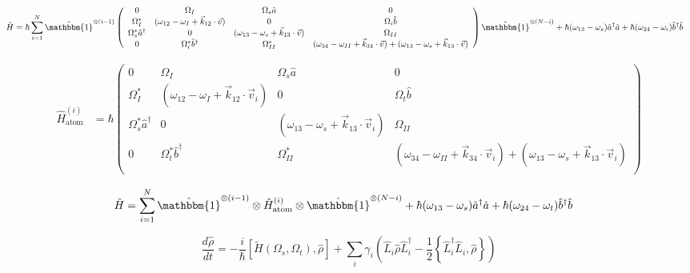 \documentclass[aps,pra,showpacs,amsmath,amssymb,nofootinbib,longbibliography,superscriptaddress
]{revtex4-1}
\theoremstyle{definition}
\theoremstyle{remark}
\newcommand{\0}{\hat{0}}
\begin{document}
\scriptsize{
\begin{align*}
    \tilde{H} &= \hbar \sum_{i=1}^{N} \hat{\mathbbm{1}}^{\otimes(i-1)} \left(\begin{array}{cccc}
        0 & \Omega_{I} & \Omega_{s} \hat{a} & 0\\
        \Omega_{I}^* & (\omega_{12} - \omega_I + \vec{k}_{12} \cdot \vec{v}) & 0 & \Omega_{i} \hat{b}\\
        \Omega_{s}^* \hat{a}^{\dagger} & 0 & (\omega_{13} - \omega_s + \vec{k}_{13} \cdot \vec{v}) & \Omega_{II}\\
        0 & \Omega_{i}^* \hat{b}^{\dagger} & \Omega_{II}^* & (\omega_{34} - \omega_{II} + \vec{k}_{34} \cdot \vec{v}) + (\omega_{13} - \omega_s + \vec{k}_{13} \cdot \vec{v})\\
    \end{array}\right) \hat{\mathbbm{1}}^{\otimes(N-i)}
     + \hbar (\omega_{13} - \omega_s) \hat{a}^{\dagger}\hat{a} + \hbar (\omega_{24} - \omega_i)  \hat{b}^{\dagger}\hat{b}
\end{align*}
}

\normalsize

\begin{align*}
    \hat{H}_{\text{atom}}^{(i)} &= \hbar \left(\begin{array}{cccc}
        0 & \Omega_{I} & \Omega_{s} \hat{a} & 0\\
        \Omega_{I}^* & (\omega_{12} - \omega_I + \vec{k}_{12} \cdot \vec{v}_i) & 0 & \Omega_{t} \hat{b}\\
        \Omega_{s}^* \hat{a}^{\dagger} & 0 & (\omega_{13} - \omega_s + \vec{k}_{13} \cdot \vec{v}_i) & \Omega_{II}\\
        0 & \Omega_{t}^* \hat{b}^{\dagger} & \Omega_{II}^* & (\omega_{34} - \omega_{II} + \vec{k}_{34} \cdot \vec{v}_i) + (\omega_{13} - \omega_s + \vec{k}_{13} \cdot \vec{v}_i)\\
    \end{array}\right)
\end{align*}

\begin{align*}
    \tilde{H} &= \sum_{i=1}^{N} \hat{\mathbbm{1}}^{\otimes(i-1)} \otimes \hat{H}_{\text{atom}}^{(i)} \otimes \hat{\mathbbm{1}}^{\otimes(N-i)} + \hbar (\omega_{13} - \omega_s) \hat{a}^{\dagger}\hat{a} + \hbar (\omega_{24} - \omega_t)  \hat{b}^{\dagger}\hat{b}
\end{align*}

\begin{equation}
    \frac{d \hat{\rho}}{dt} = - \frac{i}{\hbar} \left[\tilde{H}(\Omega_s, \Omega_t), \hat{\rho} \right] + \sum_{i} \gamma_i \left( \hat{L}_i \hat{\rho} \hat{L}_i^{\dagger} - \frac{1}{2} \left\{ \hat{L}_i^{\dagger} \hat{L}_i, \hat{\rho} \right\} \right)
\end{equation}
\end{document}
